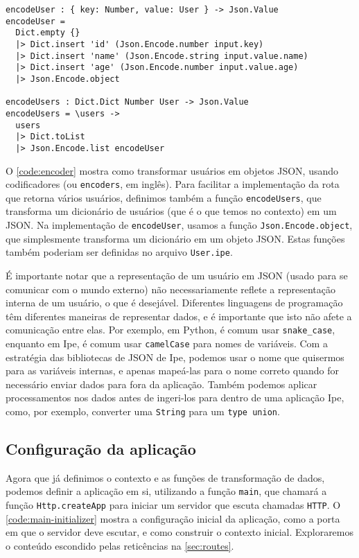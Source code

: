 \begin{lstlisting}[label={code:encoder},caption={Transformando um usuário em JSON}]
encodeUser : { key: Number, value: User } -> Json.Value
encodeUser = 
  Dict.empty {}
  |> Dict.insert 'id' (Json.Encode.number input.key)
  |> Dict.insert 'name' (Json.Encode.string input.value.name)
  |> Dict.insert 'age' (Json.Encode.number input.value.age)
  |> Json.Encode.object

encodeUsers : Dict.Dict Number User -> Json.Value
encodeUsers = \users ->
  users
  |> Dict.toList
  |> Json.Encode.list encodeUser
\end{lstlisting}


O \autoref{code:encoder} mostra como transformar usuários em objetos JSON, usando codificadores (ou
\texttt{encoders}, em inglês). Para facilitar a implementação da rota que retorna vários usuários,
definimos também a função \texttt{encodeUsers}, que transforma um dicionário de usuários (que é o que
temos no contexto) em um JSON. Na implementação de \texttt{encodeUser}, usamos a função
\texttt{Json.Encode.object}, que simplesmente transforma um dicionário em um objeto JSON. Estas
funções também poderiam ser definidas no arquivo \texttt{User.ipe}.

É importante notar que a representação de um usuário em JSON (usado para se comunicar com o mundo
externo) não necessariamente reflete a representação interna de um usuário, o que é desejável.
Diferentes linguagens de programação têm diferentes maneiras de representar dados, e é importante
que isto não afete a comunicação entre elas. Por exemplo, em Python, é comum usar \texttt{snake\_case},
enquanto em Ipe, é comum usar \texttt{camelCase} para nomes de variáveis. Com a estratégia das bibliotecas
de JSON de Ipe, podemos usar o nome que quisermos para as variáveis internas, e apenas mapeá-las
para o nome correto quando for necessário enviar dados para fora da aplicação. Também podemos aplicar
processamentos nos dados antes de ingeri-los para dentro de uma aplicação Ipe, como, por exemplo,
converter uma \texttt{String} para um \texttt{type union}.

\subsection{Configuração da aplicação}

Agora que já definimos o contexto e as funções de transformação de dados, podemos definir a aplicação
em si, utilizando a função \texttt{main}, que chamará a função \texttt{Http.createApp} para iniciar
um servidor que escuta chamadas \texttt{HTTP}. O \autoref{code:main-initializer} mostra a configuração
inicial da aplicação, como a porta em que o servidor deve escutar, e como construir o contexto inicial.
Exploraremos o conteúdo escondido pelas reticências na \autoref{sec:routes}.

